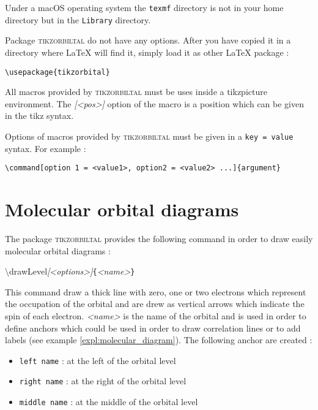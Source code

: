 \documentclass[10pt]{article}
\newcommand*{\cmd}[1]{{\ttfamily\color{blue!50!black}$\setminus$#1}\xspace}
\newcommand*{\opt}[1]{{\ttfamily\itshape\color{green!60!black}[<#1>]}\xspace}
\newcommand*{\marg}[1]{{\ttfamily\itshape\color{red!95!black}<#1>}\xspace}
\newcommand{\package}{\textsc{\sffamily\color{blue!50!black}tikzorbiltal}\xspace}
\begin{document}
Under a macOS operating system the \verb!texmf! directory is not in your home directory but in the \verb!Library! directory.

Package \package do not have any options. After you have copied it in a directory where \LaTeX{} will find it, simply load it as other \LaTeX{} package :

\begin{lstlisting}
\usepackage{tikzorbital}
\end{lstlisting}

All macros provided by \package must be uses inside a tikzpicture environment. The \opt{pos} option of the macro is a position which can be given in the tikz syntax.

Options of macros provided by \package must be given in a \texttt{key = value} syntax. For example :
%
\begin{lstlisting}
\command[option 1 = <value1>, option2 = <value2> ...]{argument}
\end{lstlisting}

\section{Molecular orbital diagrams}

The package \package provides the following command in order to draw easily molecular orbital diagrams :

\cmd{drawLevel}\opt{options}\texttt{\{}\marg{name}\texttt{\}}

This command draw a thick line with zero, one or two electrons which represent the occupation of the orbital and are drew as vertical arrows which indicate the spin of each electron. \marg{name} is the name of the orbital and is used in order to define anchors which could be used in order to draw correlation lines or to add labels (see example \ref{expl:molecular_diagram}). The following anchor are created :

\begin{itemize}
    \item \texttt{left name} : at the left of the orbital level
    \item \texttt{right name} : at the right of the orbital level
    \item \texttt{middle name} : at the middle of the orbital level
\end{itemize}
\end{document}
